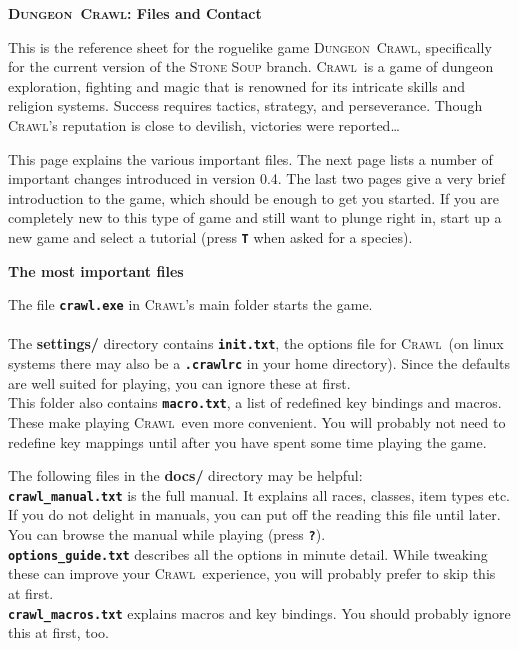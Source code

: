 \documentclass[a4paper,10pt]{article}
\newcommand{\key}[1]{{{\texttt{\textbf{#1}}}}} %
\newcommand{\sex}[1]{{{\textbf{#1}}}} %
\newcommand{\crawl}{\textsc{Crawl}}
\newcommand{\dungeon}{\textsc{Dungeon}}
\newcommand{\spacecolumn}{\begin{minipage}[t]{2cm}\phantom{xxxx}\end{minipage}}
\newcommand{\para}{\vspace{1.5ex}}
\begin{document}
\begin{center}\textbf{\LARGE
\dungeon\ \crawl: Files and Contact
}\end{center}

This is the reference sheet for the roguelike game \dungeon\ \crawl,
specifically for the current version of the \textsc{Stone Soup} branch. 
\crawl\ is a game of dungeon exploration, fighting and magic that is
renowned for its intricate skills and religion systems. Success requires
tactics, strategy, and perseverance. Though \crawl's reputation is 
close to devilish, victories were reported\dots

\para

This page explains the various important files. The next page lists a 
number of important changes introduced in version 0.4. The last two 
pages give a very brief introduction to the game, which should be 
enough to get you started. If you are completely new to this type of 
game and still want to plunge right in, start up a new game and select 
a tutorial (press \key{T} when asked for a species).

\para\para

\sex{The most important files}

\para

\begin{minipage}[t]{7cm}
The file \key{crawl.exe} in \crawl's main folder starts the game.
\\ \\
The \sex{settings/} directory contains \key{init.txt}, the options file for
\crawl\ (on linux systems there may also be a \key{.crawlrc} in your home
directory). Since the defaults are well suited for playing, you can ignore
these at first.
\\
This folder also contains \key{macro.txt}, a list of redefined key 
bindings and macros. These make playing \crawl\ even more convenient. 
You will probably not need to redefine key mappings until after you have
spent some time playing the game.
\end{minipage}
%
\spacecolumn
%
\begin{minipage}[t]{7cm}
The following files in the \sex{docs/} directory may be helpful:
\\
\key{crawl\_manual.txt} is the full manual. It explains all races, classes, 
item types etc. If you do not delight in manuals, you can put off the 
reading this file until later. You can browse the manual while playing 
(press \key{?}).
\\
\key{options\_guide.txt} describes all the options in minute detail. While
tweaking these can improve your \crawl\ experience, you will probably prefer
to skip this at first.
\\
\key{crawl\_macros.txt} explains macros and key bindings. You should probably
ignore this at first, too.
\end{minipage}
\end{document}
